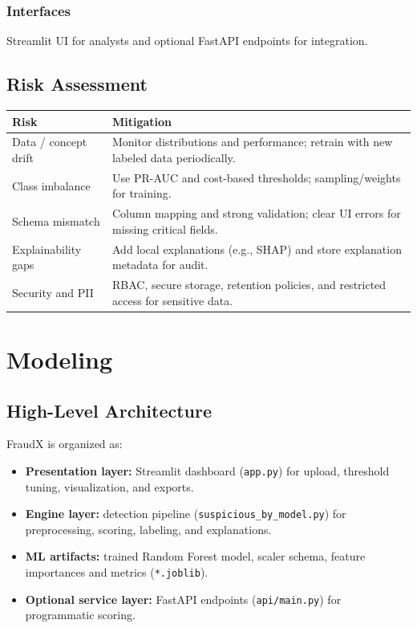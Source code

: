 \documentclass[12pt,a4paper]{report}
\begin{document}
\subsection{Interfaces}
Streamlit UI for analysts and optional FastAPI endpoints for integration.

\section{Risk Assessment}
\begin{longtable}{p{3.2cm}p{10.4cm}}
\toprule
\textbf{Risk} & \textbf{Mitigation} \\\midrule
Data / concept drift & Monitor distributions and performance; retrain with new labeled data periodically.\\
Class imbalance & Use PR-AUC and cost-based thresholds; sampling/weights for training.\\
Schema mismatch & Column mapping and strong validation; clear UI errors for missing critical fields.\\
Explainability gaps & Add local explanations (e.g., SHAP) and store explanation metadata for audit.\\
Security and PII & RBAC, secure storage, retention policies, and restricted access for sensitive data.\\
\bottomrule
\end{longtable}

\chapter{Modeling}
\section{High-Level Architecture}
FraudX is organized as:
\begin{itemize}
  \item \textbf{Presentation layer:} Streamlit dashboard (\texttt{app.py}) for upload, threshold tuning, visualization, and exports.
  \item \textbf{Engine layer:} detection pipeline (\texttt{suspicious\_by\_model.py}) for preprocessing, scoring, labeling, and explanations.
  \item \textbf{ML artifacts:} trained Random Forest model, scaler schema, feature importances and metrics (\texttt{*.joblib}).
  \item \textbf{Optional service layer:} FastAPI endpoints (\texttt{api/main.py}) for programmatic scoring.
\end{itemize}
\end{document}
